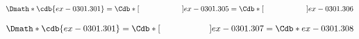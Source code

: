 \documentclass[12pt]{cdblatex}
\begin{document}
\clearpage

\begin{dgroup*}[spread={3pt}]
   \Dmath*{\cdb{ex-0301.301} = \Cdb*[\hskip2.0cm\hfill]{ex-0301.305}
                             = \Cdb*[\hskip2.0cm\hfill]{ex-0301.306}}
\end{dgroup*}

\clearpage

\begin{dgroup*}[spread={3pt}]
   \Dmath*{\cdb{ex-0301.301} = \Cdb*[\hskip2.0cm\hfill]{ex-0301.307}
                             = \Cdb*{ex-0301.308}}
\end{dgroup*}
\end{document}
